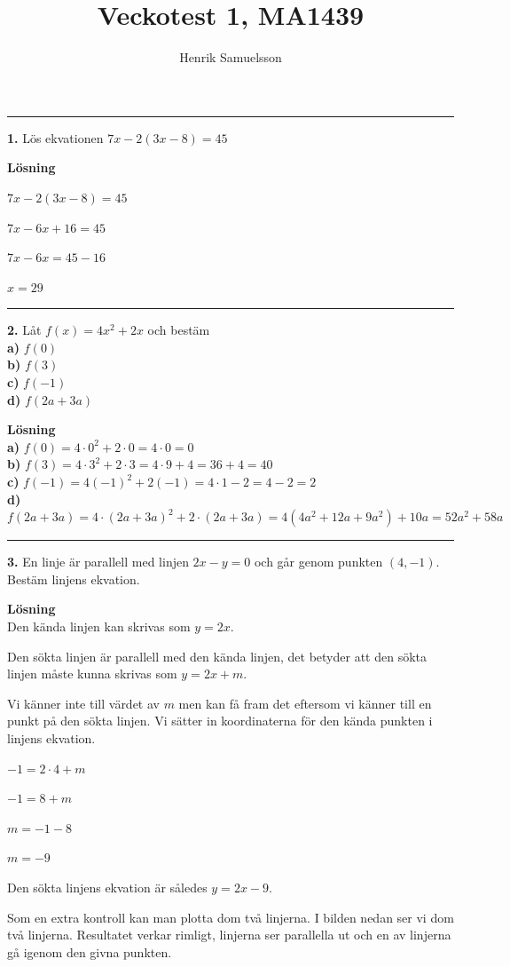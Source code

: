 \documentclass{article}
\begin{document}
\title{Veckotest 1, MA1439}
\author{Henrik Samuelsson}
\maketitle

\noindent\rule[0.5ex]{\linewidth}{0.5pt}
\textbf{1.} Lös ekvationen $7x-2(3x-8)=45$

\textbf{Lösning}

$7x-2(3x-8)=45$

$7x-6x+16=45$

$7x-6x=45-16$

$x=29$

\noindent\rule[0.5ex]{\linewidth}{0.5pt}
\textbf{2.} Låt $f(x)=4x^{2}+2x$ och bestäm\\
\textbf{a)} $f(0)$\\
\textbf{b)} $f(3)$\\
\textbf{c)} $f(-1)$\\
\textbf{d)} $f(2a + 3a)$

\textbf{Lösning}\\
\textbf{a)} $f(0)=4\cdot0^2+2\cdot0=4\cdot0=0$\\
\textbf{b)} $f(3)=4\cdot3^2+2\cdot3=4\cdot9+4=36+4=40$\\
\textbf{c)} $f(-1)=4(-1)^2+2(-1)=4\cdot1-2=4-2=2$\\
\textbf{d)} $f(2a+3a)=4\cdot(2a+3a)^2+2\cdot(2a+3a)=4(4a^2+12a+9a^2)+10a=52a^2+58a$

\noindent\rule[0.5ex]{\linewidth}{0.5pt}
\textbf{3.} En linje är parallell med linjen $2x - y = 0$ och går genom punkten $(4, -1)$. Bestäm linjens ekvation.

\textbf{Lösning}\\
Den kända linjen kan skrivas som $y = 2x$.

Den sökta linjen är parallell med den kända linjen, det betyder att den sökta linjen måste kunna skrivas som $y = 2x + m$.

Vi känner inte till värdet av $m$ men kan få fram det eftersom vi känner till en punkt på den sökta linjen. Vi sätter in koordinaterna för den kända punkten i linjens ekvation.

$-1 = 2 \cdot 4 + m$

$-1 = 8 + m$

$m = -1 - 8$

$m = -9$

Den sökta linjens ekvation är således $y = 2x - 9$.

Som en extra kontroll kan man plotta dom två linjerna. I bilden nedan ser vi dom två linjerna. Resultatet verkar rimligt, linjerna ser parallella ut och en av linjerna gå igenom den givna punkten. 
\end{document}
